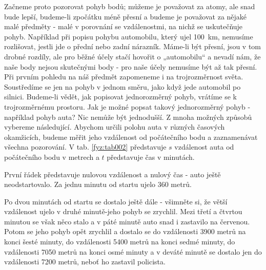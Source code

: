     Začneme proto pozorovat pohyb bodů; můžeme je považovat za atomy, ale snad bude lepší, 
    budeme-li zpočátku méně přesní a budeme je považovat za nějaké malé předměty - malé v porovnání 
    se vzdálenostmi, na nichž se uskutečňuje pohyb. Například při popisu pohybu automobilu, který 
    ujel \SI{100}{\km}, nemusíme rozlišovat, jestli jde o přední nebo zadní nárazník. Máme-li být 
    přesní, jsou v tom drobné rozdíly, ale pro běžné účely stačí hovořit o „automobilu“ a nevadí 
    nám, že naše body nejsou skutečnými body - pro naše účely nemusíme být až tak přesní. Při 
    prvním pohledu na náš předmět zapomeneme i na trojrozměrnost světa. Soustředíme se jen na pohyb 
    v jednom směru, jako když jede automobil po silnici. Budeme-li vědět, jak popisovat 
    jednorozměrný pohyb, vrátíme se k trojrozměrnému prostoru. Jak je možné popsat takový 
    jednorozměrný pohyb - například pohyb auta? Nic nemůže být jednodušší. Z mnoha možných způsobů 
    vybereme následující. Abychom určili polohu auta v různých časových okamžicích, budeme měřit 
    jeho vzdálenost od počátečního bodu a zaznamenávat všechna pozorování. V tab. \ref{fyz:tab002} 
    představuje \(s\) vzdálenost auta od počátečního bodu v metrech a \(t\) představuje čas v 
    minutách.

    První řádek představuje nulovou vzdálenost a nulový čas - auto ještě neodstartovalo. Za jednu 
    minutu od startu ujelo \num{360} metrů.

    Po dvou minutách od startu se dostalo ještě dále - všimněte si, že větší vzdálenost ujelo v 
    druhé minutě-jeho pohyb se zrychlil. Mezi třetí a čtvrtou minutou se však něco stalo a v páté 
    minutě auto snad i zastavilo na červenou. Potom se jeho pohyb opět zrychlil a dostalo se do 
    vzdálenosti \num{3900} metrů na konci šesté minuty, do vzdálenosti \num{5400} metrů na konci 
    sedmé minuty, do vzdálenosti \num{7050} metrů na konci osmé minuty a v deváté minutě se dostalo 
    jen do vzdálenosti \num{7200} metrů, neboť ho zastavil policista.

